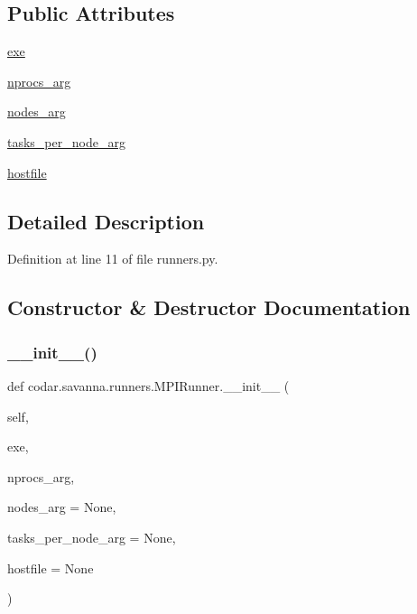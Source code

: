 \subsection*{Public Attributes}
\begin{DoxyCompactItemize}
\item 
\hyperlink{classcodar_1_1savanna_1_1runners_1_1_m_p_i_runner_a7ccd767eb30cbd555f387e5b4d781ffa}{exe}
\item 
\hyperlink{classcodar_1_1savanna_1_1runners_1_1_m_p_i_runner_aafcba954932f2160d43e820cf3abe6e1}{nprocs\+\_\+arg}
\item 
\hyperlink{classcodar_1_1savanna_1_1runners_1_1_m_p_i_runner_ad139718b16183bd45520e166d6d2b9b9}{nodes\+\_\+arg}
\item 
\hyperlink{classcodar_1_1savanna_1_1runners_1_1_m_p_i_runner_a58bd05be3e876f5a8f2522262ba934f7}{tasks\+\_\+per\+\_\+node\+\_\+arg}
\item 
\hyperlink{classcodar_1_1savanna_1_1runners_1_1_m_p_i_runner_ad36885eab0821c149e8798ffbf567af4}{hostfile}
\end{DoxyCompactItemize}


\subsection{Detailed Description}


Definition at line 11 of file runners.\+py.



\subsection{Constructor \& Destructor Documentation}
\mbox{\label{classcodar_1_1savanna_1_1runners_1_1_m_p_i_runner_a67662602e1fe9901e20e17a9f16b8259}} 
\subsubsection{\texorpdfstring{\+\_\+\+\_\+init\+\_\+\+\_\+()}{\_\_init\_\_()}}
{\footnotesize\ttfamily def codar.\+savanna.\+runners.\+M\+P\+I\+Runner.\+\_\+\+\_\+init\+\_\+\+\_\+ (\begin{DoxyParamCaption}\item[{}]{self,  }\item[{}]{exe,  }\item[{}]{nprocs\+\_\+arg,  }\item[{}]{nodes\+\_\+arg = {\ttfamily None},  }\item[{}]{tasks\+\_\+per\+\_\+node\+\_\+arg = {\ttfamily None},  }\item[{}]{hostfile = {\ttfamily None} }\end{DoxyParamCaption})}



